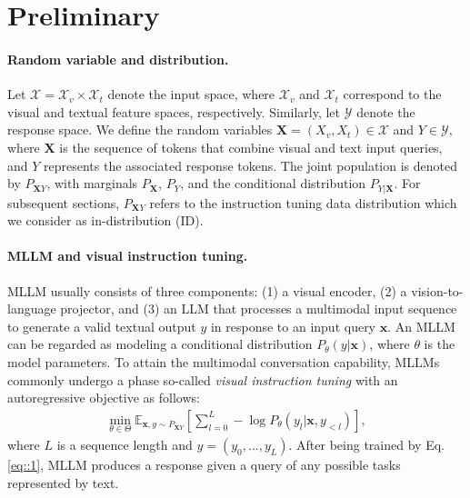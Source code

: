 \section{Preliminary} \label{sec:preliminary}
\paragraph{Random variable and distribution.} Let $\mathcal{X} = \mathcal{X}_v \times \mathcal{X}_t$ denote the input space, where $\mathcal{X}_v$ and $\mathcal{X}_t$ correspond to the visual and textual feature spaces, respectively. Similarly, let $\mathcal{Y}$ denote the response space. We define the random variables $\mathbf{X} = (X_v, X_t) \in \mathcal{X}$ and $Y \in \mathcal{Y}$, where $\mathbf{X}$ is the sequence of tokens that combine visual and text input queries, and $Y$ represents the associated response tokens. The joint population is denoted by $P_{\mathbf{X}Y}$, with marginals $P_{\mathbf{X}}$, $P_{Y}$, and the conditional distribution $P_{Y|\mathbf{X}}$. For subsequent sections, $P_{\mathbf{X}Y}$ refers to the instruction tuning data distribution which we consider as in-distribution (ID). 

\paragraph{MLLM and visual instruction tuning.} MLLM usually consists of three components: (1) a visual encoder, (2) a vision-to-language projector, and (3) an LLM that processes a multimodal input sequence to generate a valid textual output $y$ in response to an input query $\mathbf{x}$. An MLLM can be regarded as modeling a conditional distribution $P_{\theta}(y|\mathbf{x})$, where $\theta$ is the model parameters. To attain the multimodal conversation capability, MLLMs commonly undergo a phase so-called \textit{visual instruction tuning} \cite{liu2023visual, dai2023instructblip} with an autoregressive objective as follows:
{
\begin{align} \label{eq::1}
     \min_{\theta\in\Theta} \mathbb{E}_{\mathbf{x},y\sim P_{\mathbf{X}Y}} [\sum_{l=0}^{L}-\log P_{\theta}(y_{l}|\mathbf{x},y_{<l})],
\end{align}}
where $L$ is a sequence length and $y=(y_{0},...,y_{L})$. After being trained by Eq. \eqref{eq::1}, MLLM produces a response given a query of any possible tasks represented by text.

